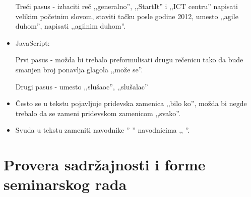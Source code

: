 \documentclass[a4paper]{report}
\begin{document}
\begin{itemize}
    Treći pasus - izbaciti reč ,,generalno'', ,,StartIt'' i ,,ICT centru'' napisati velikim početnim slovom, staviti tačku posle godine 2012, umesto ,,agile duhom'', napisati ,,agilnim duhom''. 
    \item JavaScript:
    
    Prvi pasus - možda bi trebalo preformulisati drugu rečenicu tako da bude smanjen broj ponavlja glagola ,,može se''.
    
    Drugi pasus - umesto ,,slušaoc'', ,,slušalac''
    
    \item Često se u tekstu pojavljuje pridevska zamenica ,,bilo ko'',  možda bi negde trebalo da se zameni pridevskom zamenicom ,,svako''.
    
    \item Svuda u tekstu zameniti navodnike '' '' navodnicima ,, ''.
    
   
    
\end{itemize}
\section{Provera sadržajnosti i forme seminarskog rada}
\end{document}
